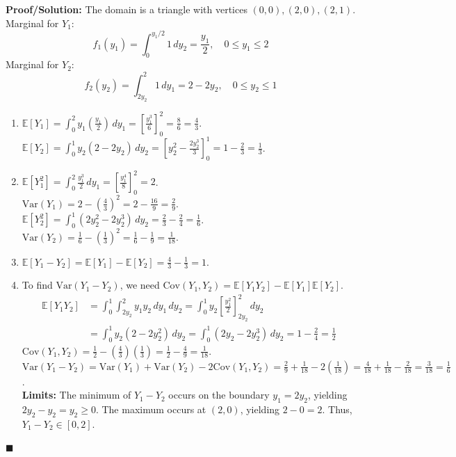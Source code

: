 \documentclass[11pt, a4paper]{article}
\theoremstyle{definition}
\theoremstyle{remark}
\newcommand{\E}{\mathbb{E}}
\newcommand{\Var}{\mathrm{Var}}
\newcommand{\Cov}{\mathrm{Cov}}
\begin{document}
\textbf{Proof/Solution:}
The domain is a triangle with vertices $(0,0), (2,0), (2,1)$.
Marginal for $Y_1$:
\[
f_1(y_1) = \int_0^{y_1/2} 1 \, dy_2 = \frac{y_1}{2}, \quad 0 \leq y_1 \leq 2
\]
Marginal for $Y_2$:
\[
f_2(y_2) = \int_{2y_2}^2 1 \, dy_1 = 2 - 2y_2, \quad 0 \leq y_2 \leq 1
\]
\begin{enumerate}[label=\alph*)]
    \item $\E[Y_1] = \int_0^2 y_1 \left(\frac{y_1}{2}\right) \, dy_1 = \left[ \frac{y_1^3}{6} \right]_0^2 = \frac{8}{6} = \frac{4}{3}$. \\ \relax
    $\E[Y_2] = \int_0^1 y_2 (2 - 2y_2) \, dy_2 = \left[ y_2^2 - \frac{2y_2^3}{3} \right]_0^1 = 1 - \frac{2}{3} = \frac{1}{3}$.
    \item $\E[Y_1^2] = \int_0^2 \frac{y_1^3}{2} \, dy_1 = \left[ \frac{y_1^4}{8} \right]_0^2 = 2$. \\ \relax
    $\Var(Y_1) = 2 - \left(\frac{4}{3}\right)^2 = 2 - \frac{16}{9} = \frac{2}{9}$. \\ \relax
    $\E[Y_2^2] = \int_0^1 (2y_2^2 - 2y_2^3) \, dy_2 = \frac{2}{3} - \frac{2}{4} = \frac{1}{6}$. \\ \relax
    $\Var(Y_2) = \frac{1}{6} - \left(\frac{1}{3}\right)^2 = \frac{1}{6} - \frac{1}{9} = \frac{1}{18}$.
    \item $\E[Y_1 - Y_2] = \E[Y_1] - \E[Y_2] = \frac{4}{3} - \frac{1}{3} = 1$.
    \item To find $\Var(Y_1 - Y_2)$, we need $\Cov(Y_1, Y_2) = \E[Y_1 Y_2] - \E[Y_1]\E[Y_2]$.
    \begin{align*}
        \E[Y_1 Y_2] &= \int_0^1 \int_{2y_2}^2 y_1 y_2 \, dy_1 \, dy_2 = \int_0^1 y_2 \left[ \frac{y_1^2}{2} \right]_{2y_2}^2 \, dy_2 \\
        &= \int_0^1 y_2 (2 - 2y_2^2) \, dy_2 = \int_0^1 (2y_2 - 2y_2^3) \, dy_2 = 1 - \frac{2}{4} = \frac{1}{2}
    \end{align*}
    $\Cov(Y_1, Y_2) = \frac{1}{2} - \left(\frac{4}{3}\right)\left(\frac{1}{3}\right) = \frac{1}{2} - \frac{4}{9} = \frac{1}{18}$. \\ \relax
    $\Var(Y_1 - Y_2) = \Var(Y_1) + \Var(Y_2) - 2\Cov(Y_1, Y_2) = \frac{2}{9} + \frac{1}{18} - 2\left(\frac{1}{18}\right) = \frac{4}{18} + \frac{1}{18} - \frac{2}{18} = \frac{3}{18} = \frac{1}{6}$. \\ \relax
    \textbf{Limits:} The minimum of $Y_1 - Y_2$ occurs on the boundary $y_1 = 2y_2$, yielding $2y_2 - y_2 = y_2 \geq 0$. The maximum occurs at $(2,0)$, yielding $2 - 0 = 2$. Thus, $Y_1 - Y_2 \in [0, 2]$.
\end{enumerate}
\hfill $\blacksquare$
\end{document}

